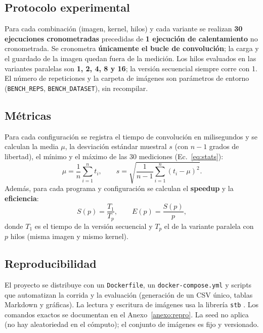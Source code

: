 \documentclass[12pt]{article}
\begin{document}
\subsection{Protocolo experimental}
\label{subsec:protocolo}
Para cada combinación (imagen, kernel, hilos) y cada variante se realizan
\textbf{30 ejecuciones cronometradas} precedidas de \textbf{1 ejecución de
calentamiento} no cronometrada. Se cronometra \textbf{únicamente el bucle de
convolución}; la carga y el guardado de la imagen quedan fuera de la medición. Los
hilos evaluados en las variantes paralelas son \textbf{1, 2, 4, 8 y 16}; la versión
secuencial siempre corre con 1. El número de repeticiones y la carpeta de imágenes
son parámetros de entorno (\texttt{BENCH\_REPS}, \texttt{BENCH\_DATASET}), sin
recompilar.

\subsection{Métricas}
\label{subsec:metricas}
Para cada configuración se registra el tiempo de convolución en milisegundos y se
calculan la media $\mu$, la desviación estándar muestral $s$ (con $n-1$ grados de
libertad), el mínimo y el máximo de las 30 mediciones (Ec.~\ref{eq:stats}):
\begin{equation}
  \mu=\frac{1}{n}\sum_{i=1}^{n} t_i, \qquad
  s=\sqrt{\frac{1}{n-1}\sum_{i=1}^{n}(t_i-\mu)^2}.
  \label{eq:stats}
\end{equation}
Además, para cada programa y configuración se calculan el \textbf{speedup} y la
\textbf{eficiencia}:
\begin{equation}
  S(p)=\frac{T_1}{T_p}, \qquad E(p)=\frac{S(p)}{p},
  \label{eq:speedup}
\end{equation}
donde $T_1$ es el tiempo de la versión secuencial y $T_p$ el de la variante
paralela con $p$ hilos (misma imagen y mismo kernel).

\subsection{Reproducibilidad}
\label{subsec:repro}
El proyecto se distribuye con un \texttt{Dockerfile}, un \texttt{docker-compose.yml}
y scripts que automatizan la corrida y la evaluación (generación de un CSV único,
tablas Markdown y gráficas). La lectura y escritura de imágenes usa la librería
\texttt{stb} \cite{stb}. Los comandos exactos se documentan en el
Anexo~\ref{anexo:repro}. La seed no aplica (no hay aleatoriedad en el cómputo); el
conjunto de imágenes es fijo y versionado.
\end{document}
